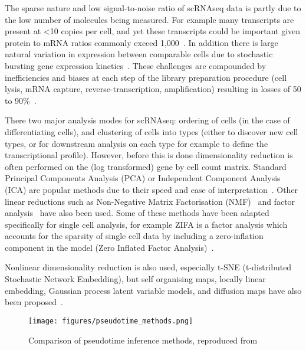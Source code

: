 The sparse nature and low signal-to-noise ratio of scRNAseq data is partly due to the low number of molecules being measured. For example many transcripts are present at \textless 10 copies per cell, and yet these transcripts could be important given protein to mRNA ratios commonly exceed 1,000~\cite{Lahtvee2017Absolute,Marguerat2012Quantitative}. In addition there is large natural variation in expression between comparable cells due to stochastic bursting gene expression kinetics~\cite{Raj2006Stochastic}. These challenges are compounded by inefficiencies and biases at each step of the library preparation procedure (cell lysis, mRNA capture, reverse-transcription, amplification) resulting in losses of 50 to 90\%~\cite{Islam2012Highly}.

There two major analysis modes for scRNAseq: ordering of cells (in the case of differentiating cells), and clustering of cells into types (either to discover new cell types, or for downstream analysis on each type for example to define the transcriptional profile). However, before this is done dimensionality reduction is often performed on the (log transformed) gene by cell count matrix. Standard Principal Components Analysis (PCA) or Independent Component Analysis (ICA) are popular methods due to their speed and ease of interpretation~\cite{Satija2015Spatial,Trapnell2014dynamics}. Other linear reductions such as Non-Negative Matrix Factorisation (NMF)~\cite{Shao2017Robust} and factor analysis~\cite{Buettner2015Computational} have also been used. Some of these methods have been adapted specifically for single cell analysis, for example ZIFA is a factor analysis which accounts for the sparsity of single cell data by including a zero-inflation component in the model (Zero Inflated Factor Analysis)~\cite{Pierson2015ZIFA}.

Nonlinear dimensionality reduction is also used, especially t-SNE (t-distributed Stochastic Network Embedding), but self organising maps, locally linear embedding, Gaussian process latent variable models, and diffusion maps have also been proposed~\cite{Kim2015SingleCell,Welch2016SLICER,Haghverdi2015Diffusion,Campbell2015Bayesian}.

\begin{figure}[H]
	\centering
	\texttt{[image: figures/pseudotime\_methods.png]}
	\caption{Comparison of pseudotime inference methods, reproduced from~\cite{Cannoodt2016Computational}}
	\label{fig:pseudotime_methods}
\end{figure}

